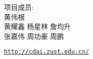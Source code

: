 \documentclass[12pt, notitlepage,
draft
]{ctexbook}
\begin{document}
	\pagestyle{empty}
	
	\cleardoublepage
	\thispagestyle{empty}
	\begin{titlepage}
	\centering
	\noindent
	\center
	\begin{minipage}{\linewidth}
	\fontsize{60}{72}\par
	\vspace{12pt}
	\fontsize{21}{25}\par
	\vspace{8cm}
	\heiti{}
	\raggedright
	项目成员:\\
	
	\vspace*{1em}
	黄伟根\\
	黄耀鑫 \hspace{1em} 杨星林 \hspace{1em} 詹均升 \\
	张嘉伟 \hspace{1em} 周功豪 \hspace{1em} 周鹏 \\
	\end{minipage}
	\vfill
	\par
	\href{http://cdai.zust.edu.cn/}{\texttt{http://cdai.zust.edu.cn/}}
	\end{titlepage}

	\cleardoublepage
	

	\tableofcontents

	\pagestyle{headings}	
	
	
	
	
\end{document}

